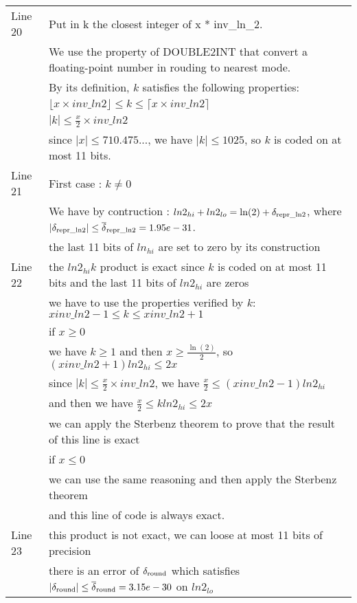 \begin{tabular}{ll}
Line 20 & Put in k the closest integer of x * inv\_ln\_2. \\
        & We use the property of DOUBLE2INT that convert a floating-point number in rouding to nearest mode. \\
        & By its definition, $k$ satisfies the following properties:\\
        &  $\lfloor x \times inv\_ln2 \rfloor \leq k \leq \lceil x \times inv\_ln2\rceil$ \\
        & $|k| \leq \frac{x}{2} \times inv\_ln2$ \\
        & since $|x| \leq 710.475...$, we have $|k| \leq 1025$, so $k$ is coded on at most 11 bits. \\
Line 21 & First case : $k \neq 0$ \\
        & We have by contruction : $ln2_{hi} + ln2_{lo} = \ln(2) + \delta_{\mathrm{repr\_ln2}}$, where $|\delta_{\mathrm{repr\_ln2}}| \leq {\overline{\delta}}_{\mathrm{repr\_ln2}} = 1.95e-31$.\\
        & the last 11 bits of $ln_{hi}$ are set to zero by its construction \\
Line 22 & the $ln2_{hi}  k$ product is exact since $k$ is coded on at most 11 bits and the last 11 bits of $ln2_{hi}$ are zeros \\
        & we have to use the properties verified by $k$: $x  inv\_ln2 - 1 \leq k \leq x  inv\_ln2 + 1$\\
        & if $x \geq 0$ \\
        & we have $ k \geq 1$ and then $x \geq \frac{\ln(2)}{2}$, so $(x  inv\_ln2 + 1)ln2_{hi} \leq 2 x$\\
        & since $|k| \leq \frac{x}{2} \times inv\_ln2$, we have $\frac{x}{2} \leq (x  inv\_ln2 - 1)ln2_{hi}$\\
        & and then we have $\frac{x}{2} \leq k  ln2_{hi} \leq 2 x$\\
        & we can apply the Sterbenz theorem to prove that the result of this line is exact\\
        & if $x \leq 0$\\
        & we can use the same reasoning and then apply the Sterbenz theorem\\
        & and this line of code is always exact. \\
Line 23 & this product is not exact, we can loose at most 11 bits of precision\\
        & there is an error of $\delta_{\mathrm{round}}$ which satisfies $|\delta_{\mathrm{round}}|\leq {\overline{\delta}}_{\mathrm{round}} = 3.15e-30$ on $ln2_{lo}$ \\

\end{tabular}
